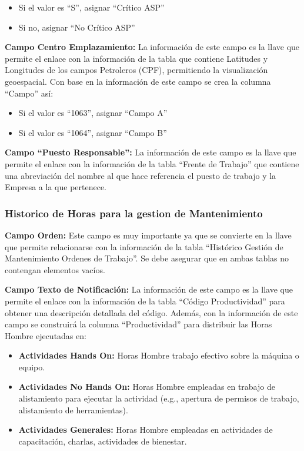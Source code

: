 \documentclass[
  11pt,
  bookmarksnumbered]{article}
\begin{document}
\begin{itemize}
\item
  Si el valor es ``S'', asignar ``Crítico ASP''
\item
  Si no, asignar ``No Crítico ASP''
\end{itemize}

\textbf{Campo Centro Emplazamiento:} La información de este campo es la llave que permite el enlace con la información de la tabla que contiene Latitudes y Longitudes de los campos Petroleros (CPF), permitiendo la visualización geoespacial.
Con base en la información de este campo se crea la columna ``Campo'' así:

\begin{itemize}
\item
  Si el valor es ``1063'', asignar ``Campo A''
\item
  Si el valor es ``1064'', asignar ``Campo B''
\end{itemize}

\textbf{Campo ``Puesto Responsable'':} La información de este campo es la llave que permite el enlace con la información de la tabla ``Frente de Trabajo'' que contiene una abreviación del nombre al que hace referencia el puesto de trabajo y la Empresa a la que pertenece.

\hypertarget{historico-de-horas-para-la-gestion-de-mantenimiento}{%
\subsubsection{Historico de Horas para la gestion de Mantenimiento}\label{historico-de-horas-para-la-gestion-de-mantenimiento}}

\textbf{Campo Orden:} Este campo es muy importante ya que se convierte en la llave que permite relacionarse con la información de la tabla ``Histórico Gestión de Mantenimiento Ordenes de Trabajo''.
Se debe asegurar que en ambas tablas no contengan elementos vacíos.

\textbf{Campo Texto de Notificación:} La información de este campo es la llave que permite el enlace con la información de la tabla ``Código Productividad'' para obtener una descripción detallada del código.
Además, con la información de este campo se construirá la columna ``Productividad'' para distribuir las Horas Hombre ejecutadas en:

\begin{itemize}
\item
  \textbf{Actividades Hands On:} Horas Hombre trabajo efectivo sobre la máquina o equipo.
\item
  \textbf{Actividades No Hands On:} Horas Hombre empleadas en trabajo de alistamiento para ejecutar la actividad (e.g., apertura de permisos de trabajo, alistamiento de herramientas).
\item
  \textbf{Actividades Generales:} Horas Hombre empleadas en actividades de capacitación, charlas, actividades de bienestar.
\end{itemize}
\end{document}
